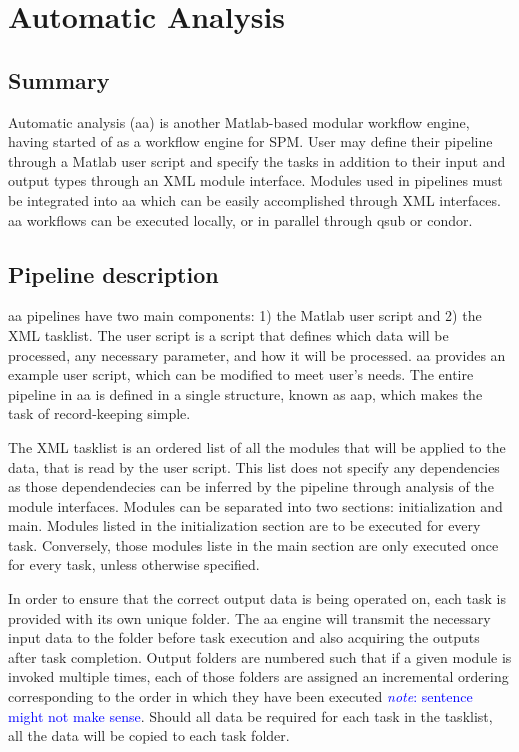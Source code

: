 \documentclass{report}
\newcommand{\note}[1]{\textcolor{blue}{\textit{note}: #1}}
\begin{document}
    \section{Automatic Analysis} \subsection{Summary} Automatic analysis (aa) is
    another Matlab-based modular workflow engine, having started of as a
    workflow engine for SPM. User may define their pipeline through a Matlab
    user script and specify the tasks in addition to their input and output
    types through an XML module interface. Modules used in pipelines must be
    integrated into aa which can be easily accomplished through XML interfaces.
    aa workflows can be executed locally, or in parallel through qsub or condor.

        \subsection{Pipeline description} aa pipelines have two main components:
        1) the Matlab user script and 2) the XML tasklist. The user script is a
        script that defines which data will be processed, any necessary
        parameter, and how it will be processed. aa provides an example user
        script, which can be modified to meet user's needs. The entire pipeline
        in aa is defined in a single structure, known as aap, which makes the
        task of record-keeping simple.

        The XML tasklist is an ordered list of all the modules that will be
        applied to the data, that is read by the user script. This list does not
        specify any dependencies as those dependendecies can be inferred by the
        pipeline through analysis of the module interfaces. Modules can be
        separated into two sections: initialization and main. Modules listed in
        the initialization section are to be executed for every task.
        Conversely, those modules liste in the main section are only executed
        once for every task, unless otherwise specified.


        In order to ensure that the correct output data is being operated on,
        each task is provided with its own unique folder. The aa engine will
        transmit the necessary input data to the folder before task execution
        and also acquiring the outputs after task completion. Output folders are
        numbered such that if a given module is invoked multiple times, each of
        those folders are assigned an incremental ordering corresponding to the
        order in which they have been executed \note{sentence might not make
        sense}. Should all data be required for each task in the tasklist, all
        the data will be copied to each task folder.
\end{document}

